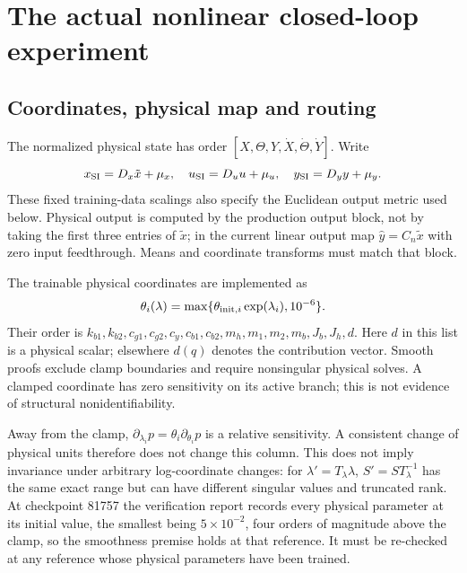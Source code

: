 \documentclass[11pt,a4paper]{article}
\theoremstyle{remark}
\begin{document}
\section{The actual nonlinear closed-loop experiment}\label{sec:predictor}
\subsection{Coordinates, physical map and routing}
The normalized physical state has order $[X,\Theta,Y,\dot X,\dot\Theta,\dot Y]$. Write
\begin{equation}\label{eq:normalization}
 x_{\rm SI}=D_x\tilde x+\mu_x,\quad
 u_{\rm SI}=D_u u+\mu_u,\quad y_{\rm SI}=D_y y+\mu_y.
\end{equation}
These fixed training-data scalings also specify the Euclidean output metric used below. Physical output is computed by the production output block, not by taking the first three entries of $\tilde x$; in the current linear output map $\hat y=C_n\tilde x$ with zero input feedthrough. Means and coordinate transforms must match that block.

The trainable physical coordinates are implemented as
\begin{equation}\label{eq:logparam}
 \theta_i(\lambda)=\max\{\theta_{{\rm init},i}\exp(\lambda_i),10^{-6}\}.
\end{equation}
Their order is $k_{b1},k_{b2},c_{g1},c_{g2},c_y,c_{b1},c_{b2},m_h,m_1,m_2,m_b,J_b,J_h,d$. Here $d$ in this list is a physical scalar; elsewhere $d(q)$ denotes the contribution vector. Smooth proofs exclude clamp boundaries and require nonsingular physical solves. A clamped coordinate has zero sensitivity on its active branch; this is not evidence of structural nonidentifiability.

Away from the clamp, $\partial_{\lambda_i}p=\theta_i\partial_{\theta_i}p$ is a relative sensitivity. A consistent change of physical units therefore does not change this column. This does not imply invariance under arbitrary log-coordinate changes: for $\lambda'=T_\lambda\lambda$, $S'=ST_\lambda^{-1}$ has the same exact range but can have different singular values and truncated rank. At checkpoint 81757 the verification report records every physical parameter at its initial value, the smallest being $5\times10^{-2}$, four orders of magnitude above the clamp, so the smoothness premise holds at that reference. It must be re-checked at any reference whose physical parameters have been trained.
\end{document}
